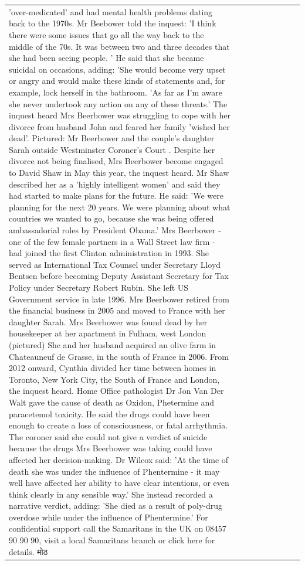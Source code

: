 \begin{table}[H]
\begin{tabular}{lllrlllll}
'over-medicated' and had mental health problems dating back to the 1970s. Mr Beebower told the inquest: 'I think there were some issues that go all the way back to the middle of the 70s. It was between two and three decades that she had been seeing people. ' He said that she became suicidal on occasions, adding: 'She would become very upset or angry and would make these kinds of statements and, for example, lock herself in the bathroom. 'As far as I'm aware she never undertook any action on any of these threats.' The inquest heard Mrs Beerbower was struggling to cope with her divorce from husband John and feared her family 'wished her dead'. Pictured: Mr Beerbower and the couple's daughter Sarah outside Westminster Coroner's Court . Despite her divorce not being finalised, Mrs Beerbower become engaged to David Shaw in May this year, the inquest heard. Mr Shaw described her as a 'highly intelligent women' and said they had started to make plans for the future. He said: 'We were planning for the next 20 years. We were planning about what countries we wanted to go, because she was being offered ambassadorial roles by President Obama.' Mrs Beerbower - one of the few female partners in a Wall Street law firm - had joined the first Clinton administration in 1993. She served as International Tax Counsel under Secretary Lloyd Bentsen before becoming Deputy Assistant Secretary for Tax Policy under Secretary Robert Rubin. She left US Government service in late 1996. Mrs Beerbower retired from the financial business in 2005 and moved to France with her daughter Sarah. Mrs Beerbower was found dead by her housekeeper at her apartment in Fulham, west London (pictured) She and her husband acquired an olive farm in Chateauneuf de Grasse, in the south of France in 2006. From 2012 onward, Cynthia divided her time between homes in Toronto, New York City, the South of France and London, the inquest heard. Home Office pathologist Dr Jon Van Der Walt gave the cause of death as Oxidon, Phetermine and paracetemol toxicity. He said the drugs could have been enough to create a loss of consciousness, or fatal arrhythmia. The coroner said she could not give a verdict of suicide because the drugs Mrs Beerbower was taking could have affected her decision-making. Dr Wilcox said: 'At the time of death she was under the influence of Phentermine - it may well have affected her ability to have clear intentions, or even think clearly in any sensible way.' She instead recorded a narrative verdict, adding: 'She died as a result of poly-drug overdose while under the influence of Phentermine.' For confidential support call the Samaritans in the UK on 08457 90 90 90, visit a local Samaritans branch or click here for details. मोठ \\

\end{tabular}
\end{table}

